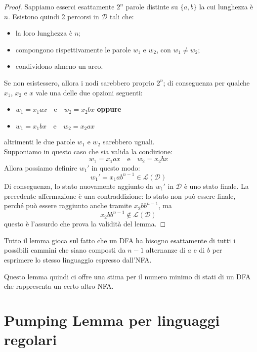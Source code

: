 \documentclass[class=book, crop=false, oneside, 12pt]{standalone}
\begin{document}
\begin{proof}
    Sappiamo esserci esattamente \(2^n\) parole distinte su \(\{a, b\}\) la cui lunghezza è \(n\). Esistono quindi 2 percorsi in \(\mathcal{D}\) tali che:
    \begin{itemize}
        \item la loro lunghezza è \(n\);
        \item compongono rispettivamente le parole \(w_1\) e \(w_2\), con \(w_1 \neq w_2\);
        \item condividono almeno un arco.
    \end{itemize}
    Se non esistessero, allora i nodi sarebbero proprio \(2^n\); di conseguenza per qualche \(x_1\), \(x_2\) e \(x\) vale una delle due opzioni seguenti:
    \begin{itemize}
        \item \(w_1 = x_1 a x \quad \textrm{e} \quad w_2 = x_2 b x\) \textbf{oppure}
        \item \(w_1 = x_1 b x \quad \textrm{e} \quad w_2 = x_2 a x\)
    \end{itemize}
    altrimenti le due parole \(w_1\) e \(w_2\) sarebbero uguali.\\
    Supponiamo in questo caso che sia valida la condizione:
    \begin{equation*}
        w_1 = x_1 a x \quad \textrm{e} \quad w_2 = x_2 b x
    \end{equation*}
    Allora possiamo definire \(w_1'\) in questo modo:
    \begin{equation*}
        w_1' = x_1 a b^{n-1} \in \mathcal{L}(\mathcal{D})
    \end{equation*}
    Di conseguenza, lo stato nuovamente aggiunto da \(w_1'\) in \(\mathcal{D}\) è uno stato finale.
    La precedente affermazione è una contraddizione: lo stato non può essere finale, perché può essere raggiunto anche tramite \(x_2 b b^{n-1}\), ma 
    \begin{equation*}
        x_2 b b^{n-1} \notin \mathcal{L}(\mathcal{D})
    \end{equation*}
    questo è l'assurdo che prova la validità del lemma.
\end{proof}
Tutto il lemma gioca sul fatto che un DFA ha bisogno esattamente di tutti i possibili cammini che siano composti da \(n-1\) alternanze di \(a\) e di \(b\) per esprimere lo stesso linguaggio espresso dall'NFA.

Questo lemma quindi ci offre una stima per il numero minimo di stati di un DFA che rappresenta un certo altro NFA.

\section{Pumping Lemma per linguaggi regolari}
\end{document}
